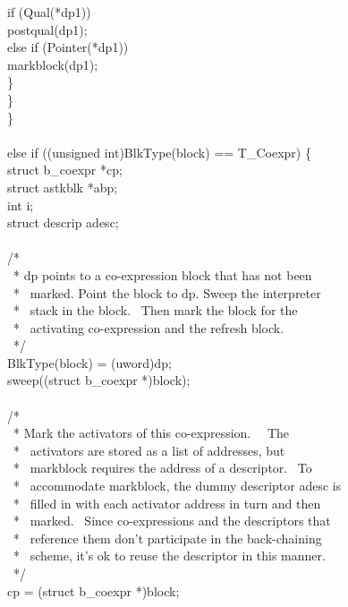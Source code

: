 {\>\>\>\>\>if (Qual(*dp1))\\
\>\>\>\>\>\>postqual(dp1);\\
\>\>\>\>\>else if (Pointer(*dp1))\\
\>\>\>\>\>\>markblock(dp1);\\
\>\>\>\>\>\}\\
\>\>\>\}\\
\>\>\}\\
\\
\>else if ((unsigned int)BlkType(block) == T\_Coexpr) \{\\
\>\>struct b\_coexpr *cp;\\
\>\>struct astkblk *abp;\\
\>\>int i;\\
\>\>struct descrip adesc;\\
\\
\>\>/*\\
\>\>\ * dp points to a co-expression block that has not been\\
\>\>\ * \ marked. Point the block to dp. Sweep the interpreter\\
\>\>\ * \ stack in the block. \ Then mark the block for the\\
\>\>\ * \ activating co-expression and the refresh block.\\
\>\>\ */\\
\>\>BlkType(block) = (uword)dp;\\
\>\>sweep((struct b\_coexpr *)block);\\
\\
\>\>/*\\
\>\>\ * Mark the activators of this co-expression. \ \ The\\
\>\>\ * \ activators are stored as a list of addresses, but\\
\>\>\ * \ markblock requires the address of a descriptor. \ To\\
\>\>\ * \ accommodate markblock, the dummy descriptor adesc is\\
\>\>\ * \ filled in with each activator address in turn and then\\
\>\>\ * \ marked. \ Since co-expressions and the descriptors that\\
\>\>\ * \ reference them don't participate in the back-chaining\\
\>\>\ * \ scheme, it's ok to reuse the descriptor in this manner.\\
\>\>\ */\\
\>\>cp = (struct b\_coexpr *)block;\\
}
